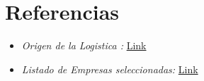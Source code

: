 \documentclass[
10pt, %
a4paper, %
oneside, %
headinclude,footinclude, %
BCOR5mm, %
]{scrartcl}
\begin{document}
\section{Referencias}

\begin{itemize}
  \item \textit{Origen de la Logistica :} \href{https://clusterlogistic.org/es/historia-de-la-logistica/} {Link}
  \item \textit{Listado de Empresas seleccionadas:} \href{https://ar.kompass.com/buy-company-list/} {Link}
\end{itemize}
\end{document}
